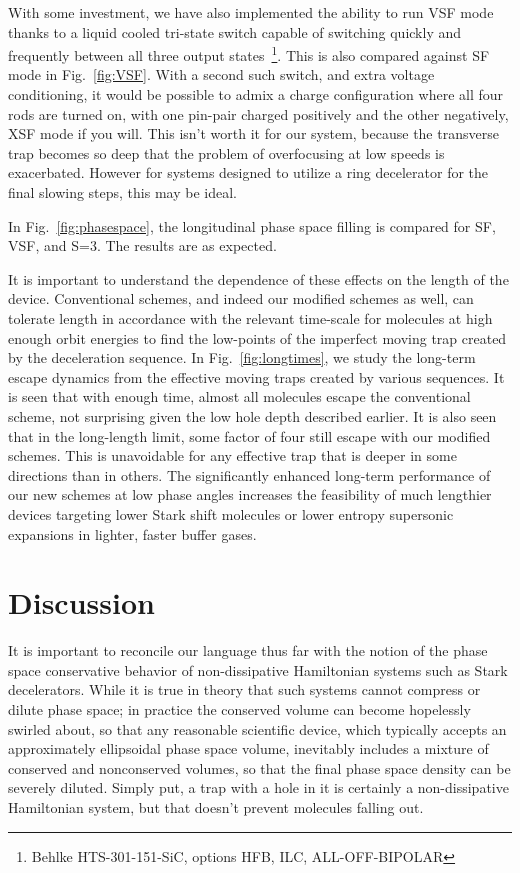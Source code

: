 \documentclass[%
 reprint,
 amsmath,amssymb,
 aps,
pra,
]{revtex4-1}
\begin{document}
With some investment, we have also implemented the ability to run VSF mode thanks to a liquid cooled tri-state switch capable of switching quickly and frequently between all three output states~\footnote{Behlke HTS-301-151-SiC, options HFB, ILC, ALL-OFF-BIPOLAR}. This is also compared against SF mode in Fig.~\ref{fig:VSF}. With a second such switch, and extra voltage conditioning, it would be possible to admix a charge configuration where all four rods are turned on, with one pin-pair charged positively and the other negatively, XSF mode if you will. This isn't worth it for our system, because the transverse trap becomes so deep that the problem of overfocusing at low speeds is exacerbated. However for systems designed to utilize a ring decelerator for the final slowing steps, this may be ideal.

In Fig.~\ref{fig:phasespace}, the longitudinal phase space filling is compared for SF, VSF, and S=3. The results are as expected.

It is important to understand the dependence of these effects on the length of the device. Conventional schemes, and indeed our modified schemes as well, can tolerate length in accordance with the relevant time-scale for molecules at high enough orbit energies to find the low-points of the imperfect moving trap created by the deceleration sequence. In Fig.~\ref{fig:longtimes}, we study the long-term escape dynamics from the effective moving traps created by various sequences. It is seen that with enough time, almost all molecules escape the conventional scheme, not surprising given the low hole depth described earlier. It is also seen that in the long-length limit, some factor of four still escape with our modified schemes. This is unavoidable for any effective trap that is deeper in some directions than in others. The significantly enhanced long-term performance of our new schemes at low phase angles increases the feasibility of much lengthier devices targeting lower Stark shift molecules or lower entropy supersonic expansions in lighter, faster buffer gases.

\section{Discussion}
It is important to reconcile our language thus far with the notion of the phase space conservative behavior of non-dissipative Hamiltonian systems such as Stark decelerators. While it is true in theory that such systems cannot compress or dilute phase space; in practice the conserved volume can become hopelessly swirled about, so that any reasonable scientific device, which typically accepts an approximately ellipsoidal phase space volume, inevitably includes a mixture of conserved and nonconserved volumes, so that the final phase space density can be severely diluted. Simply put, a trap with a hole in it is certainly a non-dissipative Hamiltonian system, but that doesn't prevent molecules falling out.
\end{document}
